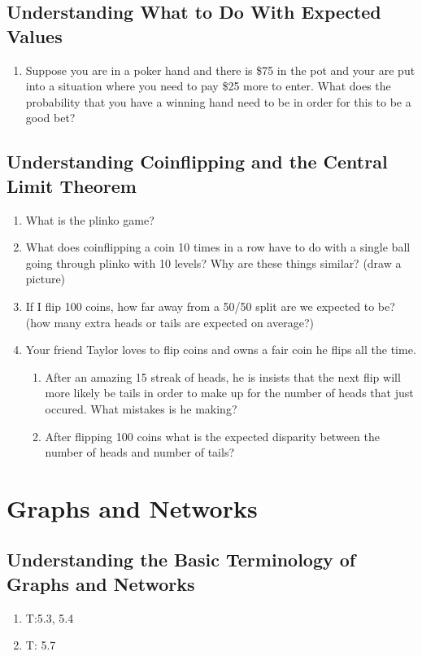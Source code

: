 \documentclass[11pt, letterpaper]{article}
\begin{document}
\subsection{Understanding What to Do With Expected Values}
\begin{enumerate}
	\item Suppose you are in a poker hand and there is \$75 in the pot and your are put into a situation where you need to pay \$25 more to enter. 
	What does the probability that you have a winning hand need to be in order for this to be a good bet?	
\end{enumerate}

\subsection{Understanding Coinflipping and the Central Limit Theorem}
\begin{enumerate}
	\item What is the plinko game? 
	\item What does coinflipping a coin 10 times in a row have to do with a single ball going through plinko with 10 levels? Why are these things similar? (draw a picture)
	\item If I flip 100 coins, how far away from a 50/50 split are we expected to be? (how many extra heads or tails are expected on average?)
	\item Your friend Taylor loves to flip coins and owns a fair coin he flips all the time. 
	\begin{enumerate}
		\item After an amazing 15 streak of heads, he is insists that the next flip will more likely be tails in order to make up for the number of heads that just occured. What mistakes is he making?
		\item After flipping 100 coins what is the expected disparity between the number of heads and number of tails?
	\end{enumerate}
\end{enumerate}

\newpage

\section{Graphs and Networks}
 
\subsection{Understanding the Basic Terminology of Graphs and Networks}
\begin{enumerate}
	\item T:5.3, 5.4
	\item T: 5.7
\end{enumerate}
\end{document}
